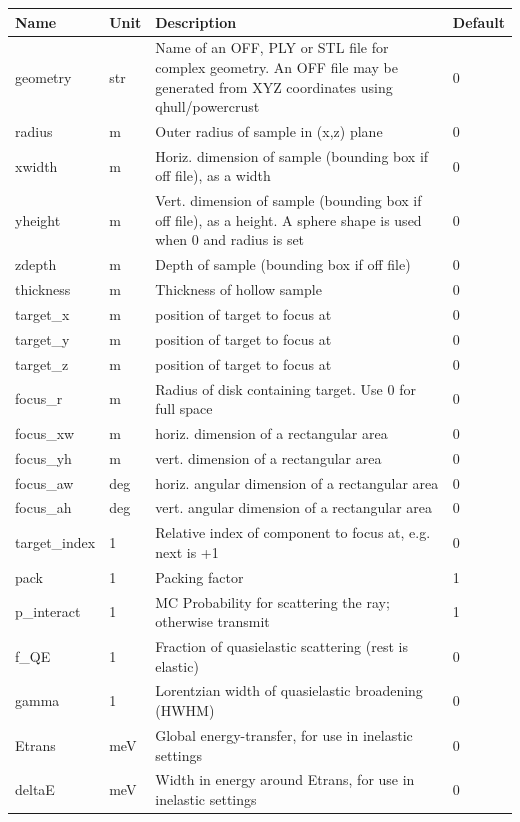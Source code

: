 \begin{longtable}{p{}p{}p{}p{}}
\toprule
\textbf{Name} & \textbf{Unit} & \textbf{Description} & \textbf{Default} \\
\midrule
\endhead
geometry & str & Name of an OFF, PLY or STL file for complex geometry. An OFF file may be generated from XYZ coordinates using qhull/powercrust & 0 \\
radius & m & Outer radius of sample in (x,z) plane & 0 \\
xwidth & m & Horiz. dimension of sample (bounding box if off file), as a width & 0 \\
yheight & m & Vert.  dimension of sample (bounding box if off file), as a height. A sphere shape is used when 0 and radius is set & 0 \\
zdepth & m & Depth of sample (bounding box if off file) & 0 \\
thickness & m & Thickness of hollow sample & 0 \\
target\_x & m & position of target to focus at & 0 \\
target\_y & m & position of target to focus at & 0 \\
target\_z & m & position of target to focus at & 0 \\
focus\_r & m & Radius of disk containing target. Use 0 for full space & 0 \\
focus\_xw & m & horiz. dimension of a rectangular area & 0 \\
focus\_yh & m & vert.  dimension of a rectangular area & 0 \\
focus\_aw & deg & horiz. angular dimension of a rectangular area & 0 \\
focus\_ah & deg & vert.  angular dimension of a rectangular area & 0 \\
target\_index & 1 & Relative index of component to focus at, e.g. next is +1 & 0 \\
pack & 1 & Packing factor & 1 \\
p\_interact & 1 & MC Probability for scattering the ray; otherwise transmit & 1 \\
f\_QE & 1 & Fraction of quasielastic scattering (rest is elastic) & 0 \\
gamma & 1 & Lorentzian width of quasielastic broadening (HWHM) & 0 \\
Etrans & meV & Global energy-transfer, for use in inelastic settings & 0 \\
deltaE & meV & Width in energy around Etrans, for use in inelastic settings & 0 \\

\end{longtable}
